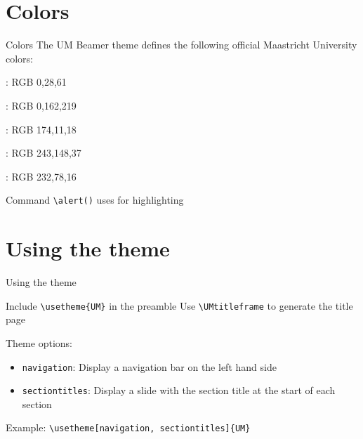 \documentclass[pdfpagelabels=false, usepdftitle=false]{beamer}
\begin{document}

\section{Colors}
\begin{frame}[fragile]{Colors}
The UM Beamer theme defines the following official Maastricht University colors:

\bigskip
\textcolor{UMdarkblue}{}:
RGB 0,28,61

\medskip
\textcolor{UMlightblue}{}: RGB 0,162,219

\medskip
\textcolor{UMred}{}: RGB 174,11,18

\medskip
\textcolor{UMorange}{}: RGB 243,148,37

\medskip
\textcolor{UMorangered}{}: RGB 232,78,16

\vfill

\begin{itemize}
  \arrowitem Command \verb+\alert()+ uses \alert{} for
  highlighting
\end{itemize}
\end{frame}



\section{Using the theme}
\begin{frame}[fragile]{Using the theme}
\vspace{-2ex}
\begin{itemize}
  \arrowitem Include \verb+\usetheme{UM}+ in the preamble
  \arrowitem Use \verb+\UMtitleframe+ to generate the title page
\end{itemize}

\vfill

\alert{Theme options}:
\begin{itemize}
  \item \verb+navigation+: Display a navigation bar on the left hand side
  \item \verb+sectiontitles+: Display a slide with the section title at the
  start of each section
\end{itemize}

\alert{Example}: \verb+\usetheme[navigation, sectiontitles]{UM}+
\end{frame}


\end{document}
